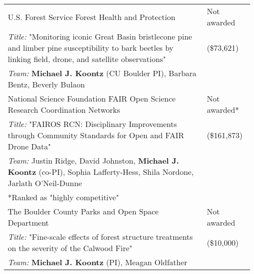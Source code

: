 \begin{longtable}{@{}>{\raggedright}p{5.25in} @{} >{\raggedleft}X@{}}

U.S. Forest Service Forest Health and Protection & Not awarded \tabularnewline
\addtolength{\leftskip}{5ex}\emph{Title:} "Monitoring iconic Great Basin bristlecone pine and limber pine susceptibility to bark beetles by linking field, drone, and satellite observations" & (\$73,621) \tabularnewline
\addtolength{\leftskip}{5ex}\emph{Team:} \textbf{Michael J. Koontz} (CU Boulder PI), Barbara Bentz, Beverly Bulaon & \tabularnewline

National Science Foundation FAIR Open Science Research Coordination Networks & Not awarded* \tabularnewline
\addtolength{\leftskip}{5ex}\emph{Title:} "FAIROS RCN: Disciplinary Improvements through Community Standards for Open and FAIR Drone Data" & (\$161,873) \tabularnewline
\addtolength{\leftskip}{5ex}\emph{Team:} Justin Ridge, David Johnston, \textbf{Michael J. Koontz} (co-PI), Sophia Lafferty-Hess, Shila Nordone, Jarlath O'Neil-Dunne \tabularnewline
\addtolength{\leftskip}{5ex} *Ranked as "highly competitive" & \tabularnewline

The Boulder County Parks and Open Space Department & Not awarded \tabularnewline
\addtolength{\leftskip}{5ex}\emph{Title:} "Fine-scale effects of forest structure treatments on the severity of the Calwood Fire" & (\$10,000) \tabularnewline
\addtolength{\leftskip}{5ex}\emph{Team:} \textbf{Michael J. Koontz} (PI), Meagan Oldfather & \tabularnewline

\end{longtable}
